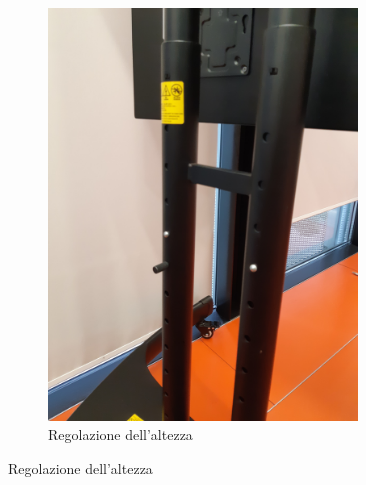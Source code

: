 \documentclass[12pt]{article}
\begin{document}
\begin{figure}[H]
\begin{subfigure}{0.5\textwidth}
                \includegraphics[width=0.9\textwidth]{img/stand_2.jpg}
                \caption*{Regolazione dell'altezza}
        \end{subfigure}
    \end{figure}
    
\end{document}
